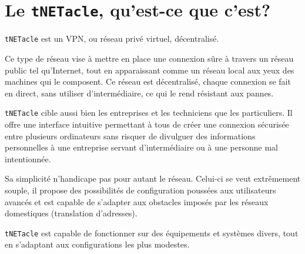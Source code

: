 \section{Le \texttt{tNETacle}, qu'est-ce que c'est?}
\texttt{tNETacle} est un VPN, ou réseau privé virtuel, décentralisé.

Ce type de réseau vise à mettre en place une connexion sûre à travers un réseau public tel qu'Internet, tout en apparaissant comme un réseau local aux yeux des machines qui le composent.
Ce réseau est décentralisé, chaque connexion se fait en direct, sans utiliser d'intermédiaire, ce qui le rend résistant aux pannes.

\texttt{tNETacle} cible aussi bien les entreprises et les techniciens que les particuliers.
Il offre une interface intuitive permettant à tous de créer une connexion sécurisée entre plusieurs ordinateurs sans risquer de divulguer des informations personnelles à une entreprise servant d'intermédiaire ou à une personne mal intentionnée.

Sa simplicité n'handicape pas pour autant le réseau. Celui-ci se veut extrêmement souple, il propose des possibilités de configuration poussées aux utilisateurs avancés et est capable de s'adapter aux obstacles imposés par les réseaux domestiques (translation d'adresses).

\texttt{tNETacle} est capable de fonctionner sur des équipements et systèmes divers, tout en s'adaptant aux configurations les plus modestes.
